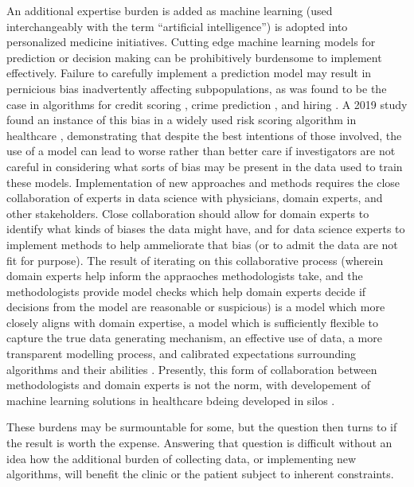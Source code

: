 An additional expertise burden is added as machine learning (used interchangeably with the term “artificial intelligence”) is adopted into personalized medicine initiatives.  Cutting edge machine learning models for prediction or decision making can be prohibitively burdensome to implement effectively. Failure to carefully implement a prediction model may result in pernicious bias inadvertently affecting subpopulations, as was found to be the case in algorithms for credit scoring \cite{barocas2016big}, crime prediction \cite{lum2016predict}, and hiring \cite{ajunwa2020paradox}.  A 2019 study found an instance of this bias in a widely used risk scoring algorithm in healthcare \cite{obermeyer2019dissecting}, demonstrating that despite the best intentions of those involved, the use of a model can lead to worse rather than better care if investigators are not careful in considering what sorts of bias may be present in the data used to train these models.  Implementation of new approaches and methods requires the close collaboration of experts in data science  with physicians, domain experts, and other stakeholders.  Close collaboration should allow for domain experts to identify what kinds of biases the data might have, and for data science experts to implement methods to help ammeliorate that bias (or to admit the data are not fit for purpose).  The result of iterating on this collaborative process (wherein domain experts help inform the appraoches methodologists take, and the methodologists provide model checks which help domain experts decide if decisions from the model are reasonable or suspicious) is a model which more closely aligns with domain expertise, a model which is sufficiently flexible to capture the true data generating mechanism, an effective use of data, a more transparent modelling process, and calibrated expectations surrounding algorithms and their abilities \cite{frohlich2018hype}.  Presently, this form of collaboration between methodologists and domain experts is not the norm, with developement of machine learning solutions in healthcare bdeing developed in silos \cite{wiens2019no}.

These burdens may be surmountable for some, but the question then turns to if the result is worth the expense.  Answering that question is difficult without an idea how the additional burden of collecting data, or implementing new algorithms, will benefit the clinic or the patient subject to inherent constraints. 

